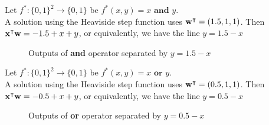 \begin{example}
    Let $f^*:\{0,1\}^2\to\{0,1\}$ be $f^*(x,y)=x\textbf{ and }y$. \\
    A solution using the Heaviside step function uses $\vw^\intercal = (1.5,1,1)$. Then $\vx^\intercal\vw = -1.5+x+y$, or equivalently, we have the line $y=1.5-x$
    \begin{figure}
    \centering
    \caption{Outputs of \textbf{and} operator separated by $y=1.5-x$}
    \label{fig-heaviside-1}
\end{figure}
\end{example}

\begin{example}
    Let $f^*:\{0,1\}^2\to\{0,1\}$ be $f^*(x,y)=x\textbf{ or }y$. \\
    A solution using the Heaviside step function uses $\vw^\intercal = (0.5,1,1)$. Then $\vx^\intercal\vw = -0.5+x+y$, or equivalently, we have the line $y=0.5-x$
    \begin{figure}
    \centering
    \caption{Outputs of \textbf{or} operator separated by $y=0.5-x$}
    \label{fig-heaviside-2}
\end{figure}
\end{example}

